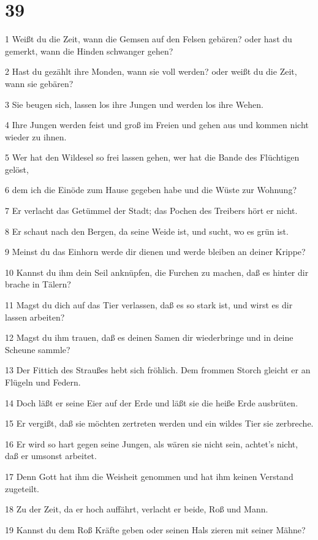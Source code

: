 \chapter{39}

\par 1 Weißt du die Zeit, wann die Gemsen auf den Felsen gebären? oder hast du gemerkt, wann die Hinden schwanger gehen?
\par 2 Hast du gezählt ihre Monden, wann sie voll werden? oder weißt du die Zeit, wann sie gebären?
\par 3 Sie beugen sich, lassen los ihre Jungen und werden los ihre Wehen.
\par 4 Ihre Jungen werden feist und groß im Freien und gehen aus und kommen nicht wieder zu ihnen.
\par 5 Wer hat den Wildesel so frei lassen gehen, wer hat die Bande des Flüchtigen gelöst,
\par 6 dem ich die Einöde zum Hause gegeben habe und die Wüste zur Wohnung?
\par 7 Er verlacht das Getümmel der Stadt; das Pochen des Treibers hört er nicht.
\par 8 Er schaut nach den Bergen, da seine Weide ist, und sucht, wo es grün ist.
\par 9 Meinst du das Einhorn werde dir dienen und werde bleiben an deiner Krippe?
\par 10 Kannst du ihm dein Seil anknüpfen, die Furchen zu machen, daß es hinter dir brache in Tälern?
\par 11 Magst du dich auf das Tier verlassen, daß es so stark ist, und wirst es dir lassen arbeiten?
\par 12 Magst du ihm trauen, daß es deinen Samen dir wiederbringe und in deine Scheune sammle?
\par 13 Der Fittich des Straußes hebt sich fröhlich. Dem frommen Storch gleicht er an Flügeln und Federn.
\par 14 Doch läßt er seine Eier auf der Erde und läßt sie die heiße Erde ausbrüten.
\par 15 Er vergißt, daß sie möchten zertreten werden und ein wildes Tier sie zerbreche.
\par 16 Er wird so hart gegen seine Jungen, als wären sie nicht sein, achtet's nicht, daß er umsonst arbeitet.
\par 17 Denn Gott hat ihm die Weisheit genommen und hat ihm keinen Verstand zugeteilt.
\par 18 Zu der Zeit, da er hoch auffährt, verlacht er beide, Roß und Mann.
\par 19 Kannst du dem Roß Kräfte geben oder seinen Hals zieren mit seiner Mähne?

